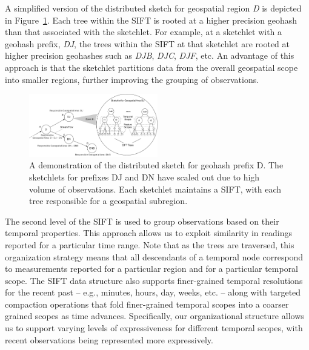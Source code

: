 A simplified version of the distributed sketch for geospatial region \emph{D} is depicted in Figure~\ref{fig:dist-sketch}. Each tree within the SIFT is rooted at a higher precision geohash than that associated with the sketchlet. For example, at a sketchlet with a geohash prefix, \emph{DJ}, the trees within the SIFT at that sketchlet are rooted at higher precision geohashes such as \emph{DJB}, \emph{DJC}, \emph{DJF}, etc. An advantage of this approach is that the sketchlet partitions data from the overall geospatial scope into smaller regions, further improving the grouping of observations.

\begin{figure}
    \centerline{\includegraphics[width=0.5\textwidth]{figures/dist-sketch.pdf}}
    \caption{A demonstration of the distributed sketch for geohash prefix D. The sketchlets for prefixes DJ and DN have scaled out due to high volume of observations. Each sketchlet maintains a SIFT, with each tree responsible for a geospatial subregion. \vspace{-1em}}
    \label{fig:dist-sketch}
\end{figure}

The second level of the SIFT is used to group observations based on their temporal properties. This approach allows us to exploit similarity in readings reported for a particular time range. Note that as the trees are traversed, this organization strategy means that all descendants of a temporal node correspond to measurements reported for a particular region and for a particular temporal scope. The SIFT data structure also supports finer-grained temporal resolutions for the recent past -- e.g., minutes, hours, day, weeks, etc. -- along with targeted compaction operations that fold finer-grained temporal scopes into a coarser grained scopes as time advances. Specifically, our organizational structure allows us to support varying levels of expressiveness for different temporal scopes, with recent observations being represented more expressively.%

